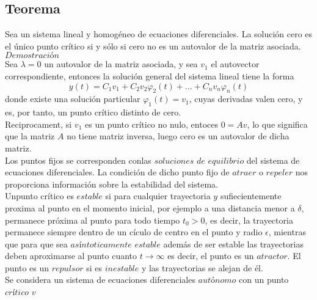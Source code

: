 \documentclass[10pt,a4paper,notitlepage]{report}
\begin{document}
\subsection*{Teorema}
Sea un sistema lineal y homogéneo de ecuaciones diferenciales. La solución cero es el único punto crítico si y sólo si cero no es un autovalor de la matriz asociada. \\
$Demostración$ \\
Sea $\lambda = 0$ un autovalor de la matriz asociada, y sea $v_{1}$ el autovector correspondiente, entonces la solución general del sistema lineal tiene la forma
\begin{equation}
y(t) = C_{1} v_{1} + C_{2} v_{2} \varphi_{2} (t) + ... + C_{n} v_{n} \varphi_{n} (t)
\end{equation}
donde existe una solución particular $\varphi_{1} (t) = v_{1}$, cuyas derivadas valen cero, y es, por tanto, un punto crítico distinto de cero. \\ Reciprocament, si $v_{1}$ es un punto crítico no nulo, entoces $0 = Av$, lo que significa que la matriz $A$ no tiene matriz inversa, luego cero es un autovalor de dicha matriz.\\
 Los puntos fijos se corresponden conlas $soluciones$ $de$ $equilibrio$ del sistema de ecuaciones diferenciales. La condición de dicho punto fijo de $atraer$ o $repeler$ nos proporciona información sobre la estabilidad del sistema. \\
Unpunto crítico es $estable$ si para cualquier trayectoria $y$ sufiecientemente proxima al punto en el momento inicial, por ejemplo a una distancia menor a $\delta$, permanece próxima al punto para todo tiempo $t_{0} > 0$, es decir, la trayectoria permanece siempre dentro de un cículo de centro en el punto y radio $\epsilon$, mientras que para que sea $asíntoticamente$ $estable$ además de ser estable las trayectorias deben aproximarse al punto cuanto $t \rightarrow \infty$ es decir, el punto es un $atractor$. El punto es un $repulsor$ si es $inestable$ y las trayectorias se alejan de él. \\
Se considera un sistema de ecuaciones diferenciales $autónomo$ con un punto $crítico$ $v$
\end{document}
